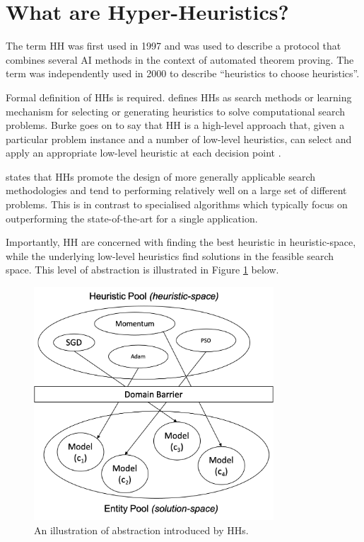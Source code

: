 \section{What are Hyper-Heuristics?}
\label{sec:hh:what_is_a_hh}

The term \acl{HH} was first used in 1997 \cite{ref:burke:2010} and was used to describe a protocol that combines several \ac{AI} methods in the context of automated theorem proving. The term was independently used in 2000 \cite{ref:cowling:2000} to describe ``heuristics to choose heuristics''.

Formal definition of \acp{HH} is required. \citeauthor{ref:burke:2010}\cite{ref:burke:2010} defines \acp{HH} as search methods or learning mechanism for selecting or generating heuristics to solve computational search problems. Burke goes on to say that \ac{HH} is a high-level approach that, given a particular problem instance and a number of low-level heuristics, can select and apply an appropriate low-level heuristic at each decision point \cite{ref:burke2003}. 

\citeauthor{ref:grobler:2015} \cite{ref:grobler:2015} states that \acp{HH} promote the design of more generally applicable search methodologies and tend to performing relatively well on a large set of different problems. This is in contrast to specialised algorithms which typically focus on outperforming the state-of-the-art for a single application.

Importantly, \ac{HH} are concerned with finding the best heuristic in heuristic-space, while the underlying low-level heuristics find solutions in the feasible search space. This level of abstraction is illustrated in Figure \ref{fig:heuristics:hh:hh_algorithm} below.

\begin{figure}[htbp]
    \begin{centering}
        \includegraphics[width=0.8\textwidth]{images/hh_high_level.png}
        \caption{An illustration of abstraction introduced by \acp{HH}.}
        \label{fig:heuristics:hh:hh_algorithm}
    \end{centering}
\end{figure}

